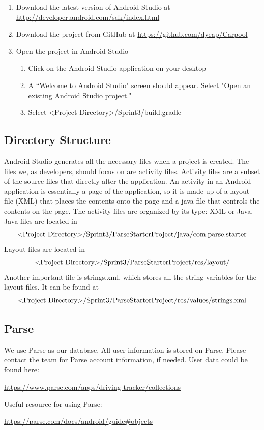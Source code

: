 \documentclass[12pt]{article}
\begin{document}
\begin{enumerate}
\item Download the latest version of Android Studio at \url{http://developer.android.com/sdk/index.html}
\item Download the project from GitHub at \url{https://github.com/dyeap/Carpool}
\item Open the project in Android Studio

\begin{enumerate}
\item Click on the Android Studio application on your desktop
\item A ``Welcome to Android Studio" screen should appear. Select "Open an existing Android Studio project."
\item Select \textless Project Directory\textgreater /Sprint3/build.gradle
\end{enumerate}

\end{enumerate}

\subsection{Directory Structure}
Android Studio generates all the necessary files when a project is created. The files we, as developers, should focus on are activity files. Activity files are a subset of the source files that directly alter the application. An activity in an Android application is essentially a page of the application, so it is made up of a layout file (XML) that places the contents onto the page and a java file that controls the contents on the page. The activity files are organized by its type: XML or Java. Java files are located in $$ \text{\textless Project Directory\textgreater/Sprint3/ParseStarterProject/java/com.parse.starter} $$ Layout files are located in $$ \text{\textless Project Directory\textgreater/Sprint3/ParseStarterProject/res/layout/} $$ Another important file is strings.xml, which stores all the string variables for the layout files. It can be found at  $$ \text{\textless Project Directory\textgreater/Sprint3/ParseStarterProject/res/values/strings.xml} $$

\subsection{Parse}
We use Parse as our database. All user information is stored on Parse. Please contact the team for Parse
account information, if needed. User data could be found here:  
\begin{center}
\url{https://www.parse.com/apps/driving-tracker/collections}  
\end{center}
Useful resource for using Parse:  
\begin{center}
\url{https://parse.com/docs/android/guide#objects}
\end{center}
\end{document}
